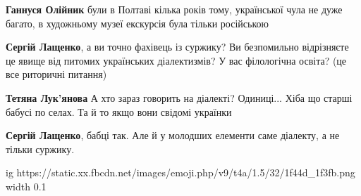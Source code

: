 \begin{itemize}
\begin{itemize}
 
\textbf{Ганнуся Олійник} були в Полтаві кілька років тому, української чула не дуже багато, в художньому музеї екскурсія була тільки російською

 
\textbf{Сергій Лащенко}, а ви точно фахівець із суржику? Ви безпомильно відрізняєте це явище від питомих українських діалектизмів? У вас філологічна освіта?
(це все риторичні питання)

 
\textbf{Тетяна Лук'янова} А хто зараз говорить на діалекті? Одиниці... Хіба що старші бабусі по селах. Та й то якщо вони свідомі українки

 
\textbf{Сергій Лащенко}, бабці так. Але й у молодших елементи саме діалекту, а не тільки суржику.

\end{itemize}

 

\ifcmt
  ig https://static.xx.fbcdn.net/images/emoji.php/v9/t4a/1.5/32/1f44d_1f3fb.png
  width 0.1
\fi

 

\end{itemize}
